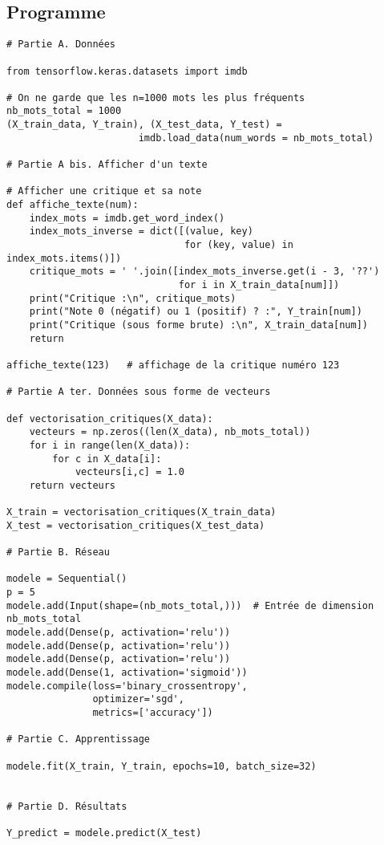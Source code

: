 \documentclass[11pt,class=report,crop=false]{standalone}
\begin{document}
\subsection{Programme}

\begin{lstlisting}
# Partie A. Données

from tensorflow.keras.datasets import imdb

# On ne garde que les n=1000 mots les plus fréquents
nb_mots_total = 1000     
(X_train_data, Y_train), (X_test_data, Y_test) = 
                       imdb.load_data(num_words = nb_mots_total)

# Partie A bis. Afficher d'un texte

# Afficher une critique et sa note 
def affiche_texte(num):
    index_mots = imdb.get_word_index()
    index_mots_inverse = dict([(value, key)
                               for (key, value) in index_mots.items()])
    critique_mots = ' '.join([index_mots_inverse.get(i - 3, '??')
                              for i in X_train_data[num]])
    print("Critique :\n", critique_mots)
    print("Note 0 (négatif) ou 1 (positif) ? :", Y_train[num])
    print("Critique (sous forme brute) :\n", X_train_data[num])
    return

affiche_texte(123)   # affichage de la critique numéro 123

# Partie A ter. Données sous forme de vecteurs

def vectorisation_critiques(X_data):
    vecteurs = np.zeros((len(X_data), nb_mots_total))
    for i in range(len(X_data)):
        for c in X_data[i]:
            vecteurs[i,c] = 1.0
    return vecteurs

X_train = vectorisation_critiques(X_train_data)
X_test = vectorisation_critiques(X_test_data)

# Partie B. Réseau 

modele = Sequential()
p = 5
modele.add(Input(shape=(nb_mots_total,)))  # Entrée de dimension nb_mots_total
modele.add(Dense(p, activation='relu'))
modele.add(Dense(p, activation='relu'))
modele.add(Dense(p, activation='relu'))
modele.add(Dense(1, activation='sigmoid'))
modele.compile(loss='binary_crossentropy',
               optimizer='sgd',
               metrics=['accuracy'])

# Partie C. Apprentissage

modele.fit(X_train, Y_train, epochs=10, batch_size=32)


# Partie D. Résultats

Y_predict = modele.predict(X_test)
\end{lstlisting}
\end{document}
